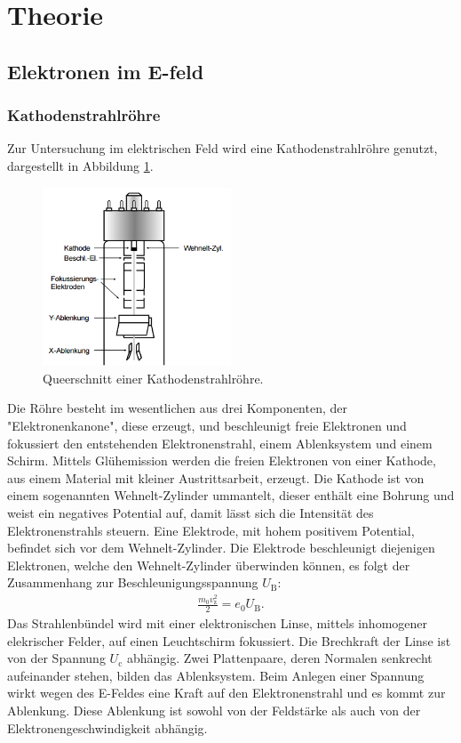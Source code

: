 \section{Theorie}
\label{sec:Theorie}
\subsection{Elektronen im E-feld}
\subsubsection{Kathodenstrahlröhre}
Zur Untersuchung im elektrischen Feld wird eine Kathodenstrahlröhre genutzt,
dargestellt in Abbildung \ref{fig:krs}.
\begin{figure}
 \centering
 \includegraphics[width=0.5\textwidth]{krs.png}
 \caption{Queerschnitt einer Kathodenstrahlröhre.}
 \label{fig:krs}
\end{figure}
Die Röhre besteht im wesentlichen aus drei Komponenten, der "Elektronenkanone",
diese erzeugt, und beschleunigt freie Elektronen und
fokussiert den entstehenden Elektronenstrahl, einem Ablenksystem und einem Schirm.
Mittels Glühemission werden die freien Elektronen von einer Kathode, aus
einem Material mit kleiner Austrittsarbeit, erzeugt.
Die Kathode ist von einem sogenannten Wehnelt-Zylinder ummantelt, dieser enthält
eine Bohrung und weist ein negatives Potential auf, damit lässt sich die
Intensität des Elektronenstrahls steuern.
Eine Elektrode, mit hohem positivem Potential, befindet sich
vor dem Wehnelt-Zylinder. Die Elektrode beschleunigt diejenigen Elektronen,
welche den Wehnelt-Zylinder überwinden können, es folgt der Zusammenhang zur Beschleunigungsspannung $U_\mathrm{B}$:
\begin{align}
  \frac{m_\mathrm{0}v_\mathrm{z}^{2}}{2}=e_\mathrm{0}U_\mathrm{B} \label{eqn:beschleunigung}.
\end{align}
Das Strahlenbündel wird mit einer elektronischen Linse, mittels
inhomogener elekrischer Felder, auf einen Leuchtschirm fokussiert.
Die Brechkraft der Linse ist von der Spannung $U_\mathrm{c}$ abhängig.
Zwei Plattenpaare, deren Normalen senkrecht aufeinander stehen, bilden
das Ablenksystem. Beim Anlegen einer Spannung wirkt wegen des E-Feldes
eine Kraft auf den Elektronenstrahl und es kommt zur Ablenkung.
Diese Ablenkung ist sowohl von der Feldstärke als auch von der
Elektronengeschwindigkeit abhängig.

